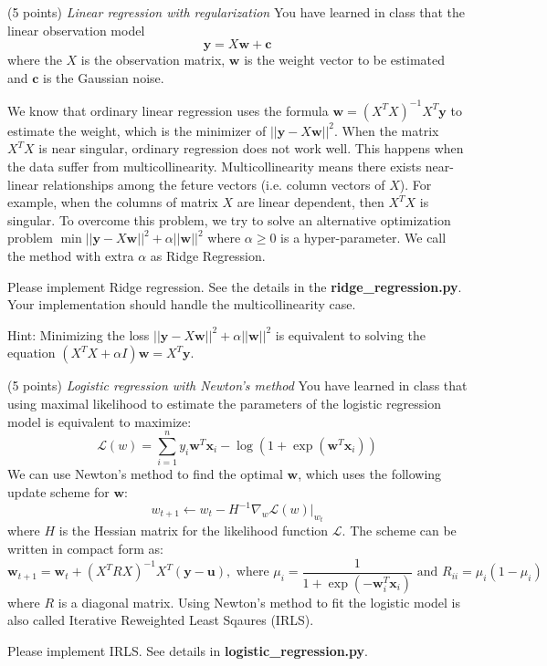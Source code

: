 \documentclass[a4paper, 12pt]{exam}
\begin{document}
\begin{questions}
\question (5 points) \emph{Linear regression with regularization} You have learned in class that the linear observation model
\begin{equation*}
\bm{y} = X\bm{w} + \bm{c}
\end{equation*}
where the $X$ is the observation matrix,
$\bm{w}$ is the weight vector to be estimated and $\bm{c}$ is the Gaussian noise.

We know that ordinary linear regression uses the formula $\bm{w} = (X^TX)^{-1}X^T\bm{y}$ to estimate the weight, which is the minimizer
of $||\bm{y} - X\bm{w}||^2$.
When the matrix $X^TX$ is near singular, ordinary regression does not work well. This happens when
the data suffer from multicollinearity. Multicollinearity means there exists near-linear relationships among the feture vectors (i.e. column vectors of $X$).
For example, when the columns of matrix $X$ are linear dependent, then $X^TX$ is singular. To overcome this problem, we try to solve an alternative optimization problem
$\min ||\bm{y} - X\bm{w}||^2 + \alpha ||\bm{w}||^2$ where $\alpha \geq 0$ is a hyper-parameter. We call the method with extra $\alpha$ as Ridge Regression.

Please implement Ridge regression. See the details in the \textbf{ridge\_regression.py}.
Your implementation should handle the multicollinearity case.

Hint: Minimizing the loss $||\bm{y} - X\bm{w}||^2 + \alpha ||\bm{w}||^2$ is equivalent to solving the equation
$( X^T X+ \alpha I)\bm{w}  = X^T \bm{y}$.

\question (5 points) \emph{Logistic regression with Newton's method} You have learned in class that using maximal likelihood to estimate the parameters of the logistic regression model is equivalent to maximize:
\begin{equation*}
\mathcal{L}(w) = \sum_{i=1}^n y_i \bm{w}^T \bm{x}_i - \log ( 1 + \exp(\bm{w}^T \bm{x}_i))
\end{equation*}
We can use Newton's method to find the optimal $\bm{w}$, which uses the following update scheme for $\bm{w}$:
\begin{equation*}
w_{t+1} \leftarrow w_t - H^{-1} \nabla_w \mathcal{L}(w)|_{w_t}
\end{equation*}
where $H$ is the Hessian matrix for the likelihood function $\mathcal{L}$.
The scheme can be written in compact form as:
\begin{equation*}
\bm{w}_{t+1} = \bm{w}_t + (X^TRX)^{-1} X^T(\bm{y}-\bm{u}), \textrm{ where } \mu_i = \frac{1}{1+\exp(-\bm{w}_i^T\bm{x}_i)} \textrm{ and } R_{ii} = \mu_i ( 1 - \mu_i)
\end{equation*}
where $R$ is a diagonal matrix. Using Newton's method to fit the logistic model is also called Iterative Reweighted Least Sqaures (IRLS).

Please implement IRLS. See details in \textbf{logistic\_regression.py}.

\end{questions}
\end{document}
